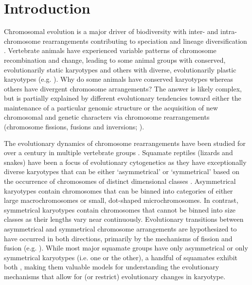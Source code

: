 \documentclass[a4paper, 12pt]{article}
\begin{document}
\section{Introduction}\label{main}

Chromosomal evolution is a major driver of biodiversity with inter- and intra-chromosome rearrangements contributing to speciation and lineage diversification \citep{pellestor2020chromoanagenesis}. 
Vertebrate animals have experienced variable patterns of chromosome recombination and change, leading to some animal groups with conserved, evolutionarily static karyotypes and others with diverse, evolutionarily plastic karyotypes (e.g. \citealt{graphodatsky2011genome,neto2011extensive,mezzasalma2019changes,degrandi2020distribution,mayrose2021evolution}).
Why do some animals have conserved karyotypes whereas others have divergent chromosome arrangements? 
The answer is likely complex, but is partially explained by different evolutionary tendencies toward either the maintenance of a particular genomic structure or the acquisition of new chromosomal and genetic characters via chromosome rearrangements (chromosome fissions, fusions and inversions; \citealt{crombach2007chromosome,amorim2021new}).

The evolutionary dynamics of chromosome rearrangements have been studied for over a century in multiple vertebrate groups \citep{damas2021vertebrate}. 
Squamate reptiles (lizards and snakes) have been a focus of evolutionary cytogenetics as they have exceptionally diverse karyotypes that can be either ‘asymmetrical’ or ‘symmetrical’ based on the occurrence of chromosomes of distinct dimensional classes \citep{stebbins1950chapter,white1973}. 
Asymmetrical karyotypes contain chromosomes that can be binned into categories of either large macrochromosomes or small, dot-shaped microchromosomes.
In contrast, symmetrical karyotypes contain chromosomes that cannot be binned into size classes as their lengths vary near continuously. 
Evolutionary transitions between asymmetrical and symmetrical chromosome arrangements are hypothesized to have occurred in both directions, primarily by the mechanisms of fission and fusion (e.g. \citealt{olmo2008trends,srikulnath2015karyotype}). 
While most major squamate groups have only asymmetrical or only symmetrical karyotypes (i.e. one or the other), a handful of squamates exhibit both \citep{mezzasalma2021lizards}, making them valuable models for understanding the evolutionary mechanisms that allow for (or restrict) evolutionary changes in karyotype.    
\end{document}
